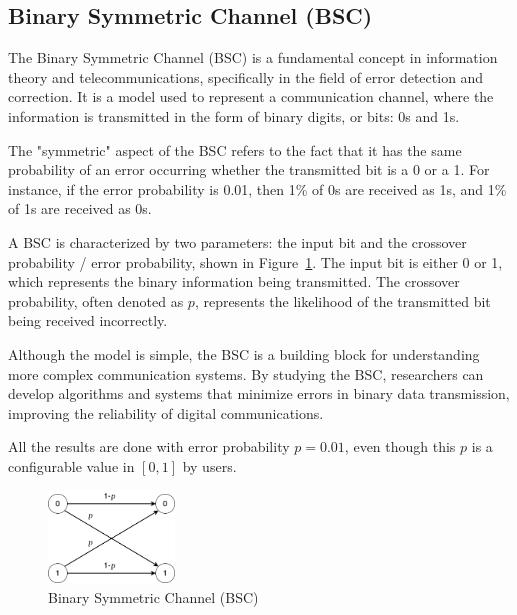 \documentclass{article}
\begin{document}
\subsection{Binary Symmetric Channel (BSC)}
The Binary Symmetric Channel (BSC) is a fundamental concept in information theory and telecommunications, specifically in the field of error detection and correction. It is a model used to represent a communication channel, where the information is transmitted in the form of binary digits, or bits: 0s and 1s.

The "symmetric" aspect of the BSC refers to the fact that it has the same probability of an error occurring whether the transmitted bit is a 0 or a 1. For instance, if the error probability is 0.01, then 1\% of 0s are received as 1s, and 1\% of 1s are received as 0s. 

A BSC is characterized by two parameters: the input bit and the crossover probability / error probability, shown in Figure~\ref{fig:bsc}. The input bit is either 0 or 1, which represents the binary information being transmitted. The crossover probability, often denoted as $p$, represents the likelihood of the transmitted bit being received incorrectly. 

Although the model is simple, the BSC is a building block for understanding more complex communication systems. By studying the BSC, researchers can develop algorithms and systems that minimize errors in binary data transmission, improving the reliability of digital communications.

All the results are done with error probability $p = 0.01$, even though this $p$ is a configurable value in $[0, 1]$ by users.

\begin{figure}[htb]
    \centering
    \includegraphics[width=0.3\textwidth]{bsc.png}
    \caption{Binary Symmetric Channel (BSC)}
    \label{fig:bsc}
\end{figure}
\end{document}
